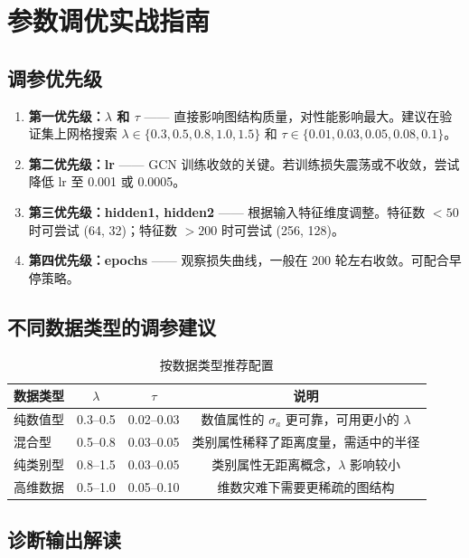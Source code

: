 \documentclass[11pt,a4paper]{ctexart}
\begin{document}
\section{参数调优实战指南}

\subsection{调参优先级}

\begin{enumerate}[leftmargin=*]
    \item \textbf{第一优先级：$\lambda$ 和 $\tau$} —— 直接影响图结构质量，对性能影响最大。建议在验证集上网格搜索 $\lambda \in \{0.3, 0.5, 0.8, 1.0, 1.5\}$ 和 $\tau \in \{0.01, 0.03, 0.05, 0.08, 0.1\}$。
    \item \textbf{第二优先级：lr} —— GCN 训练收敛的关键。若训练损失震荡或不收敛，尝试降低 lr 至 0.001 或 0.0005。
    \item \textbf{第三优先级：hidden1, hidden2} —— 根据输入特征维度调整。特征数 $< 50$ 时可尝试 (64, 32)；特征数 $> 200$ 时可尝试 (256, 128)。
    \item \textbf{第四优先级：epochs} —— 观察损失曲线，一般在 200 轮左右收敛。可配合早停策略。
\end{enumerate}

\subsection{不同数据类型的调参建议}

\begin{table}[H]\centering\caption{按数据类型推荐配置}\small
\begin{tabular}{lccc}
\toprule
数据类型 & $\lambda$ & $\tau$ & 说明 \\
\midrule
纯数值型 & 0.3--0.5 & 0.02--0.03 & 数值属性的 $\sigma_a$ 更可靠，可用更小的 $\lambda$ \\
混合型 & 0.5--0.8 & 0.03--0.05 & 类别属性稀释了距离度量，需适中的半径 \\
纯类别型 & 0.8--1.5 & 0.03--0.05 & 类别属性无距离概念，$\lambda$ 影响较小 \\
高维数据 & 0.5--1.0 & 0.05--0.10 & 维数灾难下需要更稀疏的图结构 \\
\bottomrule
\end{tabular}\end{table}

\subsection{诊断输出解读}
\end{document}
